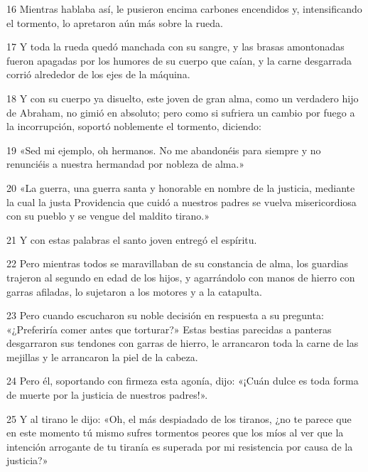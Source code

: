 \par 16 Mientras hablaba así, le pusieron encima carbones encendidos y, intensificando el tormento, lo apretaron aún más sobre la rueda.

\par 17 Y toda la rueda quedó manchada con su sangre, y las brasas amontonadas fueron apagadas por los humores de su cuerpo que caían, y la carne desgarrada corrió alrededor de los ejes de la máquina.

\par 18 Y con su cuerpo ya disuelto, este joven de gran alma, como un verdadero hijo de Abraham, no gimió en absoluto; pero como si sufriera un cambio por fuego a la incorrupción, soportó noblemente el tormento, diciendo:

\par 19 «Sed mi ejemplo, oh hermanos. No me abandonéis para siempre y no renunciéis a nuestra hermandad por nobleza de alma.»

\par 20 «La guerra, una guerra santa y honorable en nombre de la justicia, mediante la cual la justa Providencia que cuidó a nuestros padres se vuelva misericordiosa con su pueblo y se vengue del maldito tirano.»

\par 21 Y con estas palabras el santo joven entregó el espíritu.

\par 22 Pero mientras todos se maravillaban de su constancia de alma, los guardias trajeron al segundo en edad de los hijos, y agarrándolo con manos de hierro con garras afiladas, lo sujetaron a los motores y a la catapulta.

\par 23 Pero cuando escucharon su noble decisión en respuesta a su pregunta: «¿Preferiría comer antes que torturar?» Estas bestias parecidas a panteras desgarraron sus tendones con garras de hierro, le arrancaron toda la carne de las mejillas y le arrancaron la piel de la cabeza.

\par 24 Pero él, soportando con firmeza esta agonía, dijo: «¡Cuán dulce es toda forma de muerte por la justicia de nuestros padres!».

\par 25 Y al tirano le dijo: «Oh, el más despiadado de los tiranos, ¿no te parece que en este momento tú mismo sufres tormentos peores que los míos al ver que la intención arrogante de tu tiranía es superada por mi resistencia por causa de la justicia?»

